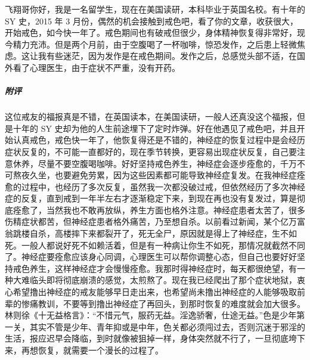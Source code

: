 \begin{case}
    飞翔哥你好，我是一名留学生，现在在美国读研，本科毕业于英国名校。有十年的 SY 史，2015 年 3 月份，偶然的机会接触到戒色吧，看了你的文章，收获很大，开始戒色，如今快一年了。戒色期间也有破戒但很少，身体精神恢复得非常好，现今精力充沛。但是两个月前，由于空腹喝了一杯咖啡，惊恐发作，之后患上轻微焦虑。这让我有些迷茫，因为发作是在戒色期间。发作之后，总感觉头部不适，在国外看了心理医生，由于症状不严重，没有开药。
    \subparagraph{附评} 这位戒友的福报真是不错，在英国读本，在美国读研，一般人还真没这个福报，但是十年的 SY 史却为他的人生前途埋下了定时炸弹。好在他遇见了戒色吧，并且开始认真戒色，戒色快一年了，他恢复得还是不错的，神经症的恢复过程中是会经历症状反复的，不可能一直都好的，现在季节转换，更容易出现症状反复，自己要注意休养，尽量不要空腹喝咖啡。好好坚持戒色养生，神经症会逐步痊愈的，千万不可熬夜久坐，也要避免劳累，因为这些因素都可能导致神经症复发。在我神经症痊愈的过程中，也经历了多次反复，虽然我一次都没破过戒，但依然经历了多次神经症的反复，直到戒到一年半左右才逐渐稳定下来，到现在再也没有复发过，算是彻底痊愈了，当然我也不敢再放纵，养生方面也格外注意。神经症患者太苦了，很多伤精症状都苦，但神经症患者格外痛苦，乃至想自杀。以前看过新闻，某个亿万富翁跳楼自杀，高楼摔下来都裂开了，死无全尸，原因就是得上了神经症，生不如死。一般人都说好死不如赖活着，但是有一种病让你生不如死，那情况就截然不同了。神经症要痊愈应该身心同调，心理医生可以帮你调整心态，但自己也要好好坚持戒色养生，这样神经症才会慢慢痊愈。我那时得神经症时，每天都很绝望，有一种大难临头即将彻底崩溃的感觉，太煎熬了。现在我已经爬出了那个症状地狱，衷心希望撸出神经症的戒友能够早日走出来，也希望尚未撸出神经症的人能够吸取前辈的惨痛教训，不要等到撸出神经症了再回头，到那时恢复的难度就会加大很多。林则徐《十无益格言》：“不惜元气，服药无益。淫逸骄奢，仕途无益。”色是少年第一关，其实不管是少年、青年抑或是中年，色关都必须闯过去，否则沉迷于邪淫的生活，报应迟早会降临，到时就像被狙掉一样，身体突然就不行了，一旦彻底垮下来，再想恢复，就需要一个漫长的过程了。
\end{case}


